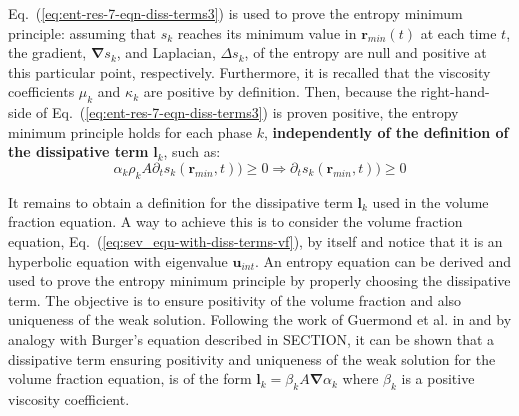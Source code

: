 \documentclass[preprint,10pt]{elsarticle}
\newcommand{\grad}{\mbold{\nabla}}
\newcommand{\mbold}[1]{\boldsymbol#1}
\newcommand{\eqt}[1]{Eq.~(\ref{#1})}                     %
\begin{document}
%
\eqt{eq:ent-res-7-eqn-diss-terms3} is used to prove the entropy minimum principle: assuming that $s_k$ reaches its minimum value in $\mbold r_{min}(t)$ at each time $t$, the gradient, $\grad s_k$, and Laplacian, $\Delta s_k$,  of the entropy are null and positive at this particular point, respectively. Furthermore, it is recalled that the viscosity coefficients $\mu_k$ and $\kappa_k$ are positive by definition. Then, because the right-hand-side of \eqt{eq:ent-res-7-eqn-diss-terms3} is proven positive, the entropy minimum principle holds for each phase $k$, \textbf{independently of the definition of the dissipative term} $\mbold l_k$, such as:
%
\begin{equation}\label{eq:ent-res-7-eqn-diss-terms4}
\alpha_k \rho_k A \partial_t s_k(\mbold r_{min},t)) \geq 0 \Rightarrow \partial_t s_k(\mbold r_{min},t)) \geq 0 \nonumber
\end{equation}
%

It remains to obtain a definition for the
dissipative term $\mbold l_k$ used in the volume fraction equation. A way to achieve this is to
consider the volume fraction equation, \eqt{eq:sev_equ-with-diss-terms-vf}, by itself and notice that it is an hyperbolic equation
with eigenvalue $\mbold u_{int}$. An entropy equation can be derived and used to prove the
entropy minimum principle by properly choosing the dissipative term. The objective is to
ensure positivity of the volume fraction and also uniqueness of the weak solution. Following
the work of Guermond et al. in \cite{jlg1, jlg2} and by analogy
with Burger's equation described in SECTION, it can be shown that a dissipative term ensuring positivity and
uniqueness of the weak solution for the volume fraction equation, is of the form $\mbold l_k = \beta_k A \grad \alpha_k $ where $\beta_k$
is a positive viscosity coefficient.
\end{document}
